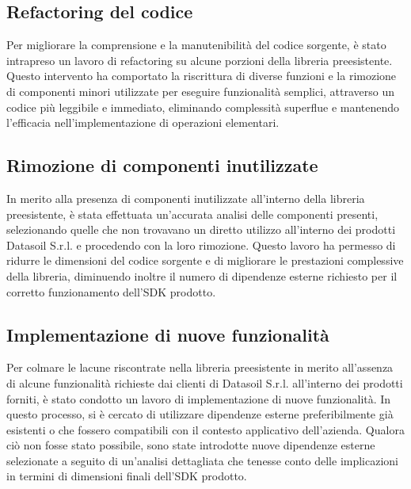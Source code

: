 \subsection{Refactoring del codice}
Per migliorare la comprensione e la manutenibilità del codice sorgente, è stato intrapreso un lavoro di refactoring su alcune porzioni della libreria preesistente.
Questo intervento ha comportato la riscrittura di diverse funzioni e la rimozione di componenti minori utilizzate per eseguire funzionalità semplici, attraverso un codice
più leggibile e immediato, eliminando complessità superflue e mantenendo l'efficacia nell'implementazione di operazioni elementari.

\subsection{Rimozione di componenti inutilizzate}
In merito alla presenza di componenti inutilizzate all'interno della libreria preesistente, è stata effettuata un'accurata analisi delle componenti presenti, selezionando
quelle che non trovavano un diretto utilizzo all'interno dei prodotti Datasoil S.r.l. e procedendo con la loro rimozione. \newline
Questo lavoro ha permesso di ridurre le dimensioni del codice sorgente e di migliorare le prestazioni complessive della libreria, diminuendo inoltre il numero di dipendenze
esterne richiesto per il corretto funzionamento dell'SDK prodotto.

\subsection{Implementazione di nuove funzionalità}
Per colmare le lacune riscontrate nella libreria preesistente in merito all'assenza di alcune funzionalità richieste dai clienti di Datasoil S.r.l. all'interno dei prodotti forniti,
è stato condotto un lavoro di implementazione di nuove funzionalità. \newline
In questo processo, si è cercato di utilizzare dipendenze esterne preferibilmente già esistenti o che fossero compatibili con il contesto applicativo dell'azienda. Qualora ciò non
fosse stato possibile, sono state introdotte nuove dipendenze esterne selezionate a seguito di un'analisi dettagliata che tenesse conto delle implicazioni in termini di dimensioni
finali dell'SDK prodotto.


